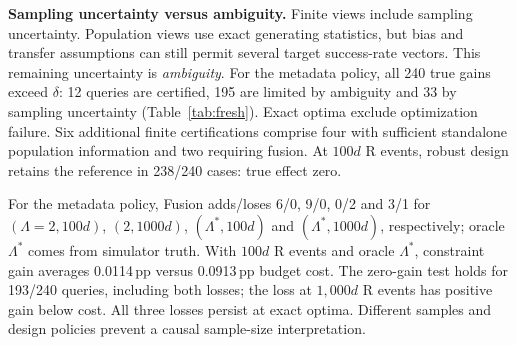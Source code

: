 \textbf{Sampling uncertainty versus ambiguity.}
Finite views include sampling uncertainty. Population views use exact generating statistics, but bias and transfer assumptions can still permit several target success-rate vectors. This remaining uncertainty is \emph{ambiguity}. For the metadata policy, all 240 true gains exceed $\delta$: 12 queries are certified, 195 are limited by ambiguity and 33 by sampling uncertainty (Table~\ref{tab:fresh}). Exact optima exclude optimization failure. Six additional finite certifications comprise four with sufficient standalone population information and two requiring fusion. At $100d$ R events, robust design retains the reference in 238/240 cases: true effect zero.

For the metadata policy, Fusion adds/loses 6/0, 9/0, 0/2 and 3/1 for $(\Lambda=2,100d)$, $(2,1000d)$, $(\Lambda^*,100d)$ and $(\Lambda^*,1000d)$, respectively; oracle $\Lambda^*$ comes from simulator truth. With $100d$ R events and oracle $\Lambda^*$, constraint gain averages 0.0114\,pp versus 0.0913\,pp budget cost. The zero-gain test holds for 193/240 queries, including both losses; the loss at $1{,}000d$ R events has positive gain below cost. All three losses persist at exact optima. Different samples and design policies prevent a causal sample-size interpretation.
